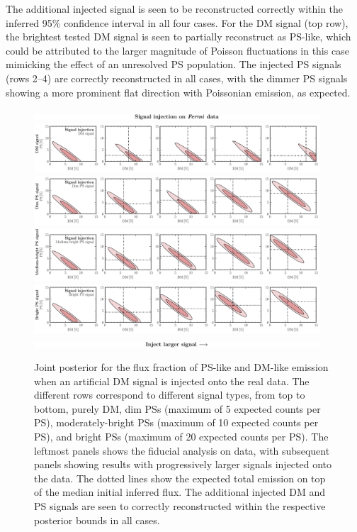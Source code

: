 \documentclass[prd,aps,10pt,nofootinbib,twocolumn,superscriptaddress,preprintnumbers,balancelastpage,longbibliography]{revtex4-1}
\begin{document}
The additional injected signal is seen to be reconstructed correctly within the inferred 95\% confidence interval in all four cases. For the DM signal (top row), the brightest tested DM signal is seen to partially reconstruct as PS-like, which could be attributed to the larger magnitude of Poisson fluctuations in this case mimicking the effect of an unresolved PS population. The injected PS signals (rows 2--4) are correctly reconstructed in all cases, with the dimmer PS signals showing a more prominent flat direction with Poissonian emission, as expected.

%
\begin{figure}
\centering
\includegraphics[width=0.95\textwidth]{plots/sig_inj_title.pdf}
\includegraphics[width=0.95\textwidth]{plots/data_sig_inj_dm.pdf}
\includegraphics[width=0.95\textwidth]{plots/data_sig_inj_dim_ps.pdf}
\includegraphics[width=0.95\textwidth]{plots/data_sig_inj_med_ps.pdf}
\includegraphics[width=0.95\textwidth]{plots/data_sig_inj_ps.pdf}
\includegraphics[width=0.95\textwidth]{plots/sig_inj_chyron.pdf}
\caption{Joint posterior for the flux fraction of PS-like and DM-like emission when an artificial DM signal is injected onto the real \Fermi data. The different rows correspond to different signal types, from top to bottom, purely DM, dim PSs (maximum of 5 expected counts per PS), moderately-bright PSs (maximum of 10 expected counts per PS), and bright PSs (maximum of 20 expected counts per PS). The leftmost panels shows the fiducial analysis on \Fermi data, with subsequent panels showing results with progressively larger signals injected onto the data. The dotted lines show the expected total emission on top of the median initial inferred flux. The additional injected DM and PS signals are seen to correctly reconstructed within the respective posterior bounds in all cases.}
\label{fig:sig_inj_data}
\end{figure}
%
\end{document}
